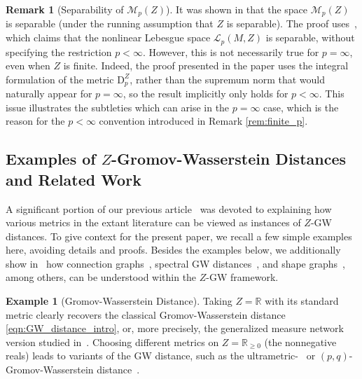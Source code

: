 \documentclass{article}
\theoremstyle{definition}
\newtheorem{example}[proposition]{Example}
\newtheorem{remark}[proposition]{Remark}
\newcommand{\R}{\mathbb{R}}
\newcommand{\M}{\mathcal{M}}
\newcommand{\MZp}{\M_p(Z)}
\newcommand{\Lp}{\mathcal{L}_p}
\newcommand{\dpz}{\mathrm{D}^Z_p}
\begin{document}
\begin{remark}[Separability of $\MZp$]\label{rem:separability}
    It was shown in \cite[Proposition 36]{bauer2025zgromovwassersteindistance} that the space $\MZp$ is separable (under the running assumption that $Z$ is separable). The proof uses~\cite[Proposition 8]{bauer2025zgromovwassersteindistance}, which claims that the nonlinear Lebesgue space $\Lp(M,Z)$ is  separable, without specifying the restriction $p < \infty$. However, this is not necessarily true for $p=\infty$, even when $Z$ is finite. Indeed, the proof presented in the paper uses the integral formulation of the metric $\dpz$, rather than the supremum norm that would naturally appear for $p = \infty$, so the result implicitly only holds for $p < \infty$. This issue illustrates the subtleties which can arise in the $p=\infty$ case, which is the reason for the $p<\infty$ convention introduced in Remark \ref{rem:finite_p}.
\end{remark}


%
%
%
%
%

%
%

%
%
%

%
%
%
%
%


%
%

%
%
%
%


\subsection{Examples of \texorpdfstring{$Z$}{Z}-Gromov-Wasserstein Distances and Related Work}\label{sec:variants_of_GW}

A significant portion of our previous article~\cite{bauer2025zgromovwassersteindistance} was devoted to explaining how various metrics in the extant literature can be viewed as instances of $Z$-GW distances. To give context for the present paper, we recall a few simple examples here, avoiding details and proofs. Besides the examples below, we additionally show in~\cite{bauer2025zgromovwassersteindistance} how connection graphs~\cite{robertson2025generalization}, spectral GW distances~\cite{memoli2009spectral,memoli2011spectral}, and shape graphs~\cite{guo2022statistical,bal2024statistical}, among others, can be understood within the $Z$-GW framework. 

\begin{example}[Gromov-Wasserstein Distance]
Taking $Z=\R$ with its standard metric clearly recovers the classical Gromov-Wasserstein distance \eqref{eqn:GW_distance_intro}, or, more precisely, the generalized measure network version studied in~\cite{chowdhury2019gromovwassersteindistancenetworksstable}. Choosing different metrics on $Z = \R_{\geq 0}$ (the nonnegative reals) leads to variants of the GW distance, such as the ultrametric-~\cite{memoli2023ultrametric} or $(p,q)$-Gromov-Wasserstein distance~\cite{arya2026gromov}.
\end{example}
\end{document}
